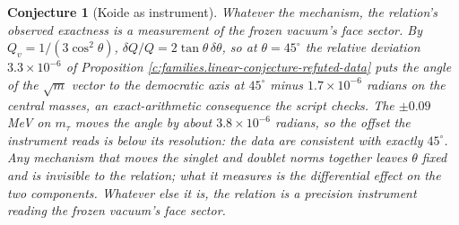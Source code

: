 \documentclass[11pt]{article}
\newtheorem{conjecture}[theorem]{Conjecture}
\theoremstyle{definition}
\theoremstyle{plain}
\begin{document}
\begin{conjecture}[Koide as instrument]\label{c:families.koide-instrument}
Whatever the mechanism, the relation's observed exactness is a measurement of the frozen vacuum's face sector. By $Q_{v} = 1/(3\cos^{2}\theta)$, $\delta Q/Q = 2\tan\theta\,\delta\theta$, so at $\theta = 45^{\circ}$ the relative deviation $3.3 \times 10^{-6}$ of Proposition \ref{c:families.linear-conjecture-refuted-data} puts the angle of the $\sqrt{m}$ vector to the democratic axis at $45^{\circ}$ minus $1.7 \times 10^{-6}$ radians on the central masses, an exact-arithmetic consequence the script checks. The $\pm 0.09$ MeV on $m_{\tau}$ moves the angle by about $3.8 \times 10^{-6}$ radians, so the offset the instrument reads is below its resolution: the data are consistent with exactly $45^{\circ}$. Any mechanism that moves the singlet and doublet norms together leaves $\theta$ fixed and is invisible to the relation; what it measures is the differential effect on the two components. Whatever else it is, the relation is a precision instrument reading the frozen vacuum's face sector.
\end{conjecture}
\end{document}
